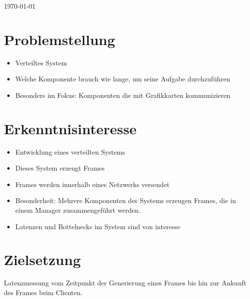 \documentclass[a4paper]{article}
\begin{document}
\begin{titlepage}
	
	\vfill\vfill\vfill %
	
	{\large \today} %
	
	
	\vfill\vfill
	
	
	\vfill %
	
\end{titlepage}

\tableofcontents
\newpage
{}
\section{Problemstellung}
\begin{itemize}
	\item Verteiltes System
	\item Welche Komponente brauch wie lange, um seine Aufgabe durchzuführen
	\item Besonders im Fokus: Komponenten die mit Grafikkarten kommunizieren
\end{itemize}
\section{Erkenntnisinteresse}
	\begin{itemize}
		\item Entwicklung eines verteilten Systems
		\item Dieses System erzeugt Frames 
		\item Frames werden innerhalb eines Netzwerks versendet
		\item Besonderheit: Mehrere Komponenten des Systems erzeugen Frames, die in einem Manager zusammengeführt werden.
		\item Latenzen und Bottelnecks im System sind von interesse
	\end{itemize}
\section{Zielsetzung}
	Latenzmessung vom Zeitpunkt der Generierung eines Frames bis hin zur Ankunft des Frames beim Clienten.
	
\end{document}
